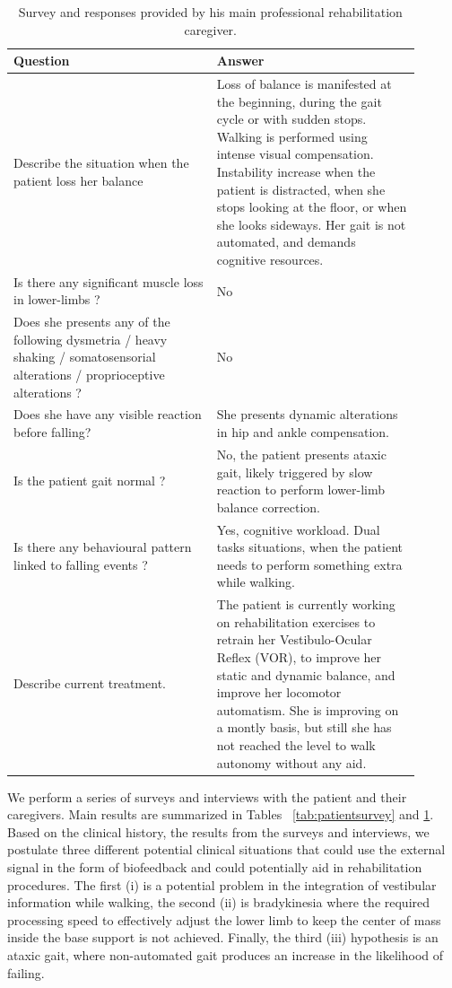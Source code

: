 \documentclass[conference]{IEEEtran}
\begin{document}
\begin{table}[t]
\begin{center}
\begin{tabular}[!t]{|p{0.45\linewidth} |p{0.45\linewidth} |}
\hline
\textbf{Question} &  \textbf{Answer} \\
\hline
\hline
Describe the situation when the patient loss her balance & Loss of balance is manifested at the beginning, during the gait cycle or with sudden stops. Walking is performed using intense visual compensation.   Instability increase when the patient is distracted, when she stops looking at the floor, or when she looks sideways.  Her gait is not automated, and demands cognitive resources. \\
\hline
Is there any significant muscle loss in lower-limbs ? & No\\
\hline
Does she presents any of the following dysmetria / heavy shaking / somatosensorial alterations / proprioceptive alterations ? & No \\
\hline
Does she have any visible reaction before falling?  & She presents dynamic alterations in hip and ankle compensation.\\
\hline
Is the patient gait normal ?  &  No, the patient presents ataxic gait, likely triggered by slow reaction to perform lower-limb balance correction. \\
\hline
Is there any behavioural pattern linked to falling events ? &  Yes, cognitive workload.  Dual tasks situations, when the patient needs to perform something extra while walking. \\
\hline
Describe current treatment. & The patient is currently working on rehabilitation exercises to retrain her Vestibulo-Ocular Reflex (VOR), to improve her static and dynamic balance, and improve her locomotor automatism.  She is improving on a montly basis, but still she has not reached the level to walk autonomy without any aid. \\
\hline
\end{tabular}
\vspace{10pt}
\caption{Survey and responses provided by his main professional rehabilitation caregiver.}
\label{tab:caregiverssurvey}
\end{center}
\end{table}

We perform a series of surveys and interviews with the patient and their caregivers.  Main results are summarized in 
Tables ~\ref{tab:patientsurvey} and \ref{tab:caregiverssurvey}.  Based on the clinical history, the results from the surveys and interviews, we postulate three different potential clinical situations that could use the external signal in the form of biofeedback and could potentially aid in rehabilitation procedures.  The first (i) is a potential problem in the integration of vestibular information while walking, the second (ii) is bradykinesia where the required processing speed to effectively adjust the lower limb to keep the center of mass inside the base support is not achieved.  Finally, the third (iii) hypothesis is an ataxic gait, where non-automated gait produces an increase in the likelihood of failing.
\end{document}
